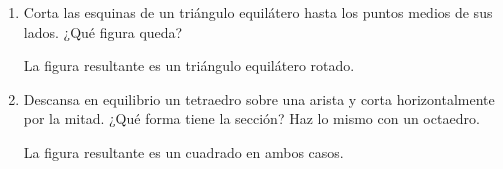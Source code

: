 \begin{enumerate}
	
	\item Corta las esquinas de un triángulo equilátero hasta los puntos medios de sus lados. ¿Qué figura queda?
	
	La figura resultante es un triángulo equilátero rotado.
	
	\item Descansa en equilibrio un tetraedro sobre una arista y corta horizontalmente por la mitad. ¿Qué forma tiene la sección? Haz lo mismo con un octaedro.
	
	La figura resultante es un cuadrado en ambos casos.
	
	\begin{figure}[H]
		\centering
	\end{figure}
	

\end{enumerate}
